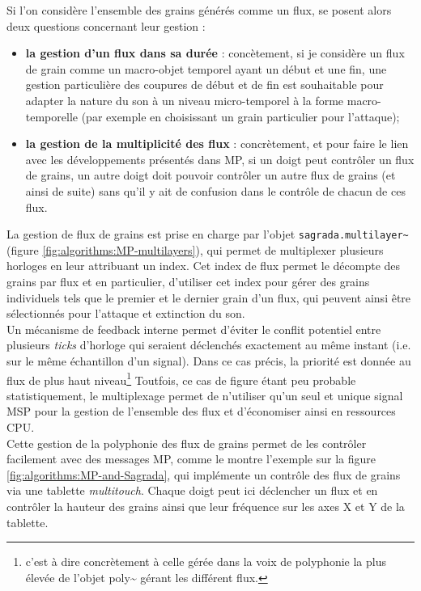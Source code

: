 \noindent Si l'on considère l'ensemble des grains générés comme un flux, se posent alors deux questions concernant leur gestion :
\vspace{-1em}
\begin{itemize}[noitemsep]
	\item \textbf{la gestion d'un flux dans sa durée} : concètement, si je considère un flux de grain comme un macro-objet temporel ayant un début et une fin, une gestion particulière des coupures de début et de fin est souhaitable pour adapter la nature du son à un niveau micro-temporel à la forme macro-temporelle (par exemple en choisissant un grain particulier pour l'attaque);
	\item \textbf{la gestion de la multiplicité des flux} : concrètement, et pour faire le lien avec les développements présentés dans MP, si un doigt peut contrôler un flux de grains, un autre doigt doit pouvoir contrôler un autre flux de grains (et ainsi de suite) sans qu'il y ait de confusion dans le contrôle de chacun de ces flux.
\end{itemize}

\noindent La gestion de flux de grains est prise en charge par l'objet \verb|sagrada.multilayer~| (figure \ref{fig:algorithms:MP-multilayers}), qui permet de multiplexer plusieurs horloges en leur attribuant un index. Cet index de flux permet le décompte des grains par flux et en particulier, d'utiliser cet index pour gérer des grains individuels tels que le premier et le dernier grain d'un flux, qui peuvent ainsi être sélectionnés pour l'attaque et extinction du son.\\
\indent Un mécanisme de feedback interne permet d'éviter le conflit potentiel entre plusieurs \textit{ticks} d'horloge qui seraient déclenchés exactement au même instant (i.e. sur le même échantillon d'un signal). Dans ce cas précis, la priorité est donnée au flux de plus haut niveau\footnote{c'est à dire concrètement à celle gérée dans la voix de polyphonie la plus élevée de l'objet poly\textasciitilde{} gérant les différent flux.} Toutfois, ce cas de figure étant peu probable statistiquement, le multiplexage permet de n'utiliser qu'un seul et unique signal \gls{MSP} pour la gestion de l'ensemble des flux et d'économiser ainsi en ressources \gls{CPU}.\\
\indent Cette gestion de la polyphonie des flux de grains permet de les contrôler facilement avec des messages MP, comme le montre l'exemple sur la figure \ref{fig:algorithms:MP-and-Sagrada}, qui implémente un contrôle des flux de grains via une tablette \textit{multitouch}. Chaque doigt peut ici déclencher un flux et en contrôler la hauteur des grains ainsi que leur fréquence sur les axes X et Y de la tablette.

